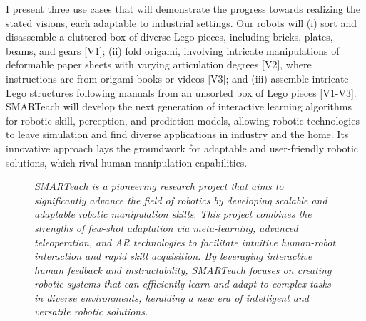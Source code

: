 \documentclass{erc-B2}
\begin{document}
I present three use cases that will demonstrate the progress towards realizing the stated visions, each adaptable to industrial settings. Our robots will (i) sort and disassemble a cluttered box of diverse Lego pieces, including bricks, plates, beams, and gears [V1]; (ii) fold origami, involving intricate manipulations of deformable paper sheets with varying articulation degrees [V2], where instructions are from origami books or videos [V3]; and (iii) assemble intricate Lego structures following manuals from an unsorted box of Lego pieces [V1-V3].
SMARTeach will develop the next generation of interactive learning algorithms for robotic skill, perception, and prediction models, allowing robotic technologies to leave simulation and find diverse applications in industry and the home. 
Its innovative approach lays the groundwork for adaptable and user-friendly robotic solutions, which rival human manipulation capabilities.

\begin{figure}[t]
    \centering
    \resizebox{0.95\textwidth}{!}{}
    \caption{\textit{\small
    SMARTeach is a pioneering research project that aims to significantly advance the field of robotics by developing scalable and adaptable robotic manipulation skills. This project combines the strengths of few-shot adaptation via meta-learning, advanced teleoperation, and AR technologies to facilitate intuitive human-robot interaction and rapid skill acquisition. By leveraging interactive human feedback and instructability, SMARTeach focuses on creating robotic systems that can efficiently learn and adapt to complex tasks in diverse environments, heralding a new era of intelligent and versatile robotic solutions\protect\footnotemark. %
    }}
    \label{fig:interfaces}
    \end{figure}
\end{document}

